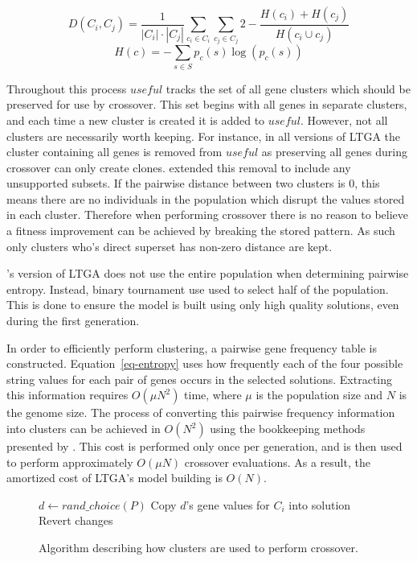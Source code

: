\documentclass[twoside]{article}
\begin{document}
\begin{equation}
  D(C_i,C_j) = \frac{1}{\left | C_i \right |\cdot \left |C_j \right|}\sum_{c_i \in C_i}\sum_{c_j \in C_j}
  2 - \frac{H(c_i) + H(c_j)}{H(c_i \cup c_j)}
  \label{eq-distance}
\end{equation}
\begin{equation}
  H(c) = -\sum_{s\in S} p_c(s)\log(p_c(s))
  \label{eq-entropy}
\end{equation}

Throughout this process $useful$ tracks the set of all gene clusters which should be preserved for use by crossover.
This set begins with all genes in separate clusters, and each time a new cluster is created it is added to $useful$.
However, not all clusters are necessarily worth keeping. For instance, in all versions of LTGA the cluster
containing all genes is removed from $useful$ as preserving all genes during crossover can only create clones.
\cite{thierens:2013:ltgahiff} extended this removal to include any unsupported subsets. If the pairwise distance
between two clusters is 0, this means there are no individuals in the population which disrupt the values stored in
each cluster. Therefore when performing crossover there is no reason to believe a fitness improvement can be achieved
by breaking the stored pattern. As such only clusters who's direct superset has non-zero distance are kept.

\cite{thierens:2013:ltgahiff}'s version of LTGA does not use the entire population when determining pairwise entropy.
Instead, binary tournament use used to select half of the population. This is done to ensure the model is built
using only high quality solutions, even during the first generation.

In order to efficiently perform clustering, a pairwise gene frequency table is constructed.
Equation~\ref{eq-entropy} uses how frequently each of the four possible string values for each
pair of genes occurs in the selected solutions. Extracting this information requires $O(\mu N^2)$
time, where $\mu$ is the population size and $N$ is the genome size. The process of converting
this pairwise frequency information into clusters can be achieved in $O(N^2)$ using the bookkeeping
methods presented by \cite{gronau:2007:upgma}. This cost is performed only once per generation,
and is then used to perform approximately $O(\mu N)$ crossover evaluations. As a result, the amortized cost of
LTGA's model building is $O(N)$.

\begin{figure}
  \begin{algorithmic}[1]
        \State $d \leftarrow rand\_choice(P)$\label{fig-cluster-usage-donate}
        \State Copy $d$'s gene values for $C_i$ into solution
            \State Revert changes
          \EndIf
        \EndIf
    \EndFor
  \EndProcedure
\end{algorithmic}
  \caption{Algorithm describing how clusters are used to perform crossover.}
  \label{fig-cluster-usage}
\end{figure}
\end{document}
